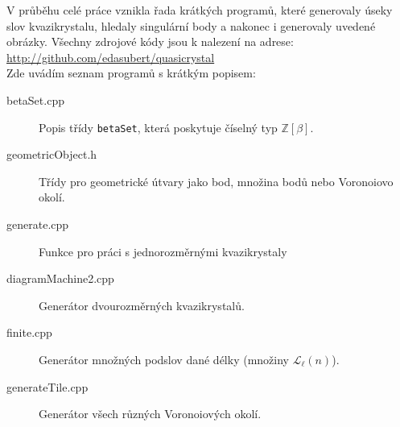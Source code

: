 \documentclass[a4paper,11pt,twoside]{article}
\theoremstyle{definition}
\theoremstyle{remark}
\newcommand{\ring}{\mathbb{Z}\left[\beta\right]}
\begin{document}
V průběhu celé práce vznikla řada krátkých programů, které generovaly úseky slov kvazikrystalu, hledaly singulární body a nakonec i generovaly uvedené obrázky. Všechny zdrojové kódy jsou k nalezení na adrese:\\
\url{http://github.com/edasubert/quasicrystal}\\
Zde uvádím seznam programů s krátkým popisem:
\begin{description}
\item[betaSet{.}cpp] Popis třídy \texttt{betaSet}, která poskytuje číselný typ $\ring$.
\item[geometricObject{.}h] Třídy pro geometrické útvary jako bod, množina bodů nebo Voronoiovo okolí.
\item[generate{.}cpp] Funkce pro práci s jednorozměrnými kvazikrystaly
\item[diagramMachine2{.}cpp] Generátor dvourozměrných kvazikrystalů.
\item[finite{.}cpp] Generátor množných podslov dané délky (množiny $\mathcal{L}_\ell(n)$).
\item[generateTile{.}cpp] Generátor všech různých Voronoiových okolí.
\end{description}

%
\end{document}
